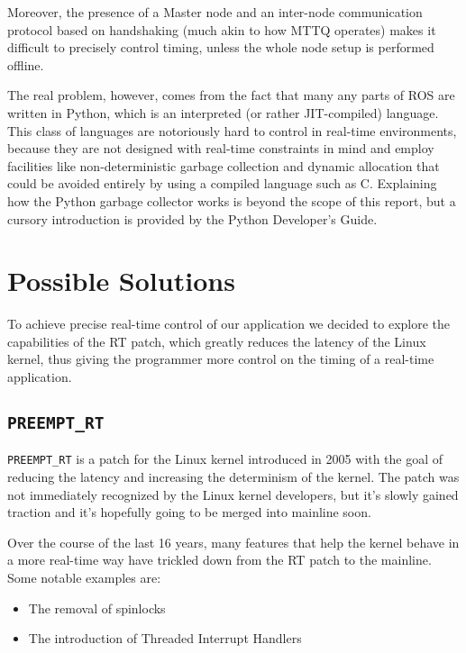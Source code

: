 \documentclass[a4paper,12pt]{report}
\begin{document}
Moreover, the presence of a Master node and an inter-node communication protocol based on handshaking (much akin to how MTTQ operates) makes it difficult to precisely control timing, unless the whole node setup is performed offline.

The real problem, however, comes from the fact that many any parts of ROS are written in Python, which is an interpreted (or rather JIT-compiled) language. This class of languages are notoriously hard to control in real-time environments, because they are not designed with real-time constraints in mind and employ facilities like non-deterministic garbage collection and dynamic allocation that could be avoided entirely by using a compiled language such as C. Explaining how the Python garbage collector works is beyond the scope of this report, but a cursory introduction is provided by the Python Developer's Guide\cite{python-devguide-gc}.

\section{Possible Solutions}

To achieve precise real-time control of our application we decided to explore the capabilities of the RT patch, which greatly reduces the latency of the Linux kernel, thus giving the programmer more control on the timing of a real-time application.

\subsection{\texttt{PREEMPT\_RT}}

\texttt{PREEMPT\_RT} is a patch for the Linux kernel introduced in 2005 with the goal of reducing the latency and increasing the determinism of the kernel. The patch was not immediately recognized by the Linux kernel developers, but it's slowly gained traction and it's hopefully going to be merged into mainline soon.\cite{lwn-rt-future}

Over the course of the last 16 years, many features that help the kernel behave in a more real-time way have trickled down from the RT patch to the mainline. Some notable examples are:

\begin{itemize}
    \item The removal of spinlocks
    \item The introduction of Threaded Interrupt Handlers
\end{itemize}
\end{document}
